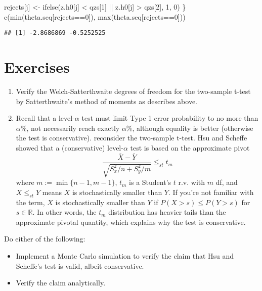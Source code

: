 \documentclass[
]{book}
\newenvironment{Shaded}{\begin{snugshade}}{\end{snugshade}}
\newcommand{\DecValTok}[1]{\textcolor[rgb]{0.00,0.00,0.81}{#1}}
\newcommand{\FunctionTok}[1]{\textcolor[rgb]{0.00,0.00,0.00}{#1}}
\newcommand{\NormalTok}[1]{#1}
\newcommand{\OtherTok}[1]{\textcolor[rgb]{0.56,0.35,0.01}{#1}}
\newcommand{\SpecialCharTok}[1]{\textcolor[rgb]{0.00,0.00,0.00}{#1}}
\providecommand{\tightlist}{%
  \setlength{\itemsep}{0pt}\setlength{\parskip}{0pt}}
\theoremstyle{definition}
\theoremstyle{definition}
\theoremstyle{definition}
\theoremstyle{definition}
\theoremstyle{remark}
\begin{document}
\begin{Shaded}
\begin{Highlighting}[]
\NormalTok{  rejects[j] }\OtherTok{\textless{}{-}} \FunctionTok{ifelse}\NormalTok{(z.h0[j] }\SpecialCharTok{\textless{}}\NormalTok{ qzs[}\DecValTok{1}\NormalTok{] }\SpecialCharTok{||}\NormalTok{ z.h0[j] }\SpecialCharTok{\textgreater{}}\NormalTok{ qzs[}\DecValTok{2}\NormalTok{], }\DecValTok{1}\NormalTok{, }\DecValTok{0}\NormalTok{)}
\NormalTok{\}}
\FunctionTok{c}\NormalTok{(}\FunctionTok{min}\NormalTok{(theta.seq[rejects}\SpecialCharTok{==}\DecValTok{0}\NormalTok{]), }\FunctionTok{max}\NormalTok{(theta.seq[rejects}\SpecialCharTok{==}\DecValTok{0}\NormalTok{]))}
\end{Highlighting}
\end{Shaded}

\begin{verbatim}
## [1] -2.8686869 -0.5252525
\end{verbatim}

\hypertarget{exercises}{%
\section{Exercises}\label{exercises}}

\begin{enumerate}
\def\labelenumi{\arabic{enumi}.}
\item
  Verify the Welch-Satterthwaite degrees of freedom for the two-sample t-test by Satterthwaite's method of moments as describes above.
\item
  Recall that a level-\(\alpha\) test must limit Type 1 error probability to no more than \(\alpha\%\), not necessarily reach exactly \(\alpha\%\), although equality is better (otherwise the test is conservative). reconsider the two-sample t-test. Hsu and Scheffe showed that a (conservative) level-\(\alpha\) test is based on the approximate pivot
  \[\frac{\overline X - \overline Y}{\sqrt{S_x^2/n + S_y^2/m}}\leq_{st} t_m\]
  where \(m:=\min\{n-1, m-1\}\), \(t_m\) is a Student's \(t\) r.v. with \(m\) df, and \(X\leq_{st} Y\) means \(X\) is stochastically smaller than \(Y\). If you're not familiar with the term, \(X\) is stochastically smaller than \(Y\) if \(P(X>s)\leq P(Y>s)\) for \(s\in \mathbb{R}\). In other words, the \(t_m\) distribution has heavier tails than the approximate pivotal quantity, which explains why the test is conservative.
\end{enumerate}

Do either of the following:

\begin{itemize}
\tightlist
\item
  Implement a Monte Carlo simulation to verify the claim that Hsu and Scheffe's test is valid, albeit conservative.
\item
  Verify the claim analytically.
\end{itemize}
\end{document}
